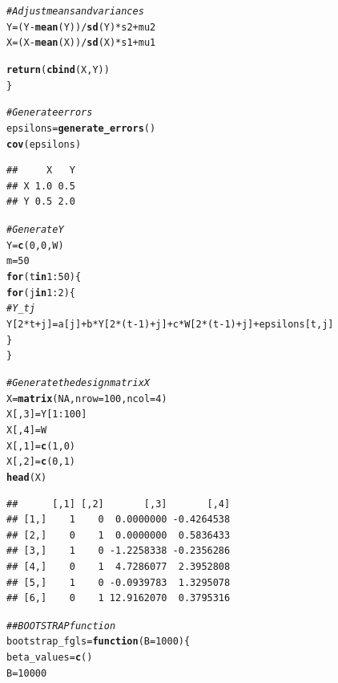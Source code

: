 \documentclass[11pt]{article}\usepackage[]{graphicx}\usepackage[]{color}
\makeatletter
\newcommand{\hlnum}[1]{\textcolor[rgb]{0.686,0.059,0.569}{#1}}%
\newcommand{\hlcom}[1]{\textcolor[rgb]{0.678,0.584,0.686}{\textit{#1}}}%
\newcommand{\hlopt}[1]{\textcolor[rgb]{0,0,0}{#1}}%
\newcommand{\hlstd}[1]{\textcolor[rgb]{0.345,0.345,0.345}{#1}}%
\newcommand{\hlkwa}[1]{\textcolor[rgb]{0.161,0.373,0.58}{\textbf{#1}}}%
\newcommand{\hlkwb}[1]{\textcolor[rgb]{0.69,0.353,0.396}{#1}}%
\newcommand{\hlkwc}[1]{\textcolor[rgb]{0.333,0.667,0.333}{#1}}%
\newcommand{\hlkwd}[1]{\textcolor[rgb]{0.737,0.353,0.396}{\textbf{#1}}}%
\newenvironment{kframe}{%
 \def\at@end@of@kframe{}%
 \ifinner\ifhmode%
  \def\at@end@of@kframe{\end{minipage}}%
  \begin{minipage}{\columnwidth}%
 \fi\fi%
 \def\FrameCommand##1{\hskip\@totalleftmargin \hskip-\fboxsep
 \colorbox{shadecolor}{##1}\hskip-\fboxsep
     \hskip-\linewidth \hskip-\@totalleftmargin \hskip\columnwidth}%
 \MakeFramed {\advance\hsize-\width
   \@totalleftmargin\z@ \linewidth\hsize
   \@setminipage}}%
 {\par\unskip\endMakeFramed%
 \at@end@of@kframe}
\newenvironment{knitrout}{}{} %
\makeatother
\begin{document}
\begin{knitrout}
\begin{kframe}
\begin{alltt}
  \hlcom{# Adjust means and variances}
  \hlstd{Y} \hlkwb{=} \hlstd{(Y}\hlopt{-}\hlkwd{mean}\hlstd{(Y))}\hlopt{/}\hlkwd{sd}\hlstd{(Y)}\hlopt{*}\hlstd{s2}\hlopt{+}\hlstd{mu2}
  \hlstd{X} \hlkwb{=} \hlstd{(X}\hlopt{-}\hlkwd{mean}\hlstd{(X))}\hlopt{/}\hlkwd{sd}\hlstd{(X)}\hlopt{*}\hlstd{s1}\hlopt{+}\hlstd{mu1}

  \hlkwd{return}\hlstd{(}\hlkwd{cbind}\hlstd{(X,Y))}
\hlstd{\}}

\hlcom{# Generate errors}
\hlstd{epsilons} \hlkwb{=} \hlkwd{generate_errors}\hlstd{()}
\hlkwd{cov}\hlstd{(epsilons)}
\end{alltt}
\begin{lstlisting}[basicstyle=\ttfamily,breaklines=true]
##     X   Y
## X 1.0 0.5
## Y 0.5 2.0
\end{lstlisting}
\begin{alltt}
\hlcom{# Generate Y}
\hlstd{Y} \hlkwb{=} \hlkwd{c}\hlstd{(}\hlnum{0}\hlstd{,}\hlnum{0}\hlstd{,W)}
\hlstd{m} \hlkwb{=} \hlnum{50}
\hlkwa{for} \hlstd{(t} \hlkwa{in} \hlnum{1}\hlopt{:}\hlnum{50}\hlstd{) \{}
  \hlkwa{for} \hlstd{(j} \hlkwa{in} \hlnum{1}\hlopt{:}\hlnum{2}\hlstd{)\{}
    \hlcom{# Y_tj}
    \hlstd{Y[}\hlnum{2}\hlopt{*}\hlstd{t}\hlopt{+}\hlstd{j]} \hlkwb{=} \hlstd{a[j]} \hlopt{+} \hlstd{b}\hlopt{*}\hlstd{Y[}\hlnum{2}\hlopt{*}\hlstd{(t}\hlopt{-}\hlnum{1}\hlstd{)}\hlopt{+}\hlstd{j]} \hlopt{+} \hlstd{c}\hlopt{*}\hlstd{W[}\hlnum{2}\hlopt{*}\hlstd{(t}\hlopt{-}\hlnum{1}\hlstd{)}\hlopt{+}\hlstd{j]} \hlopt{+} \hlstd{epsilons[t,j]}
  \hlstd{\}}
\hlstd{\}}

\hlcom{# Generate the design matrix X}
\hlstd{X} \hlkwb{=} \hlkwd{matrix}\hlstd{(}\hlnum{NA}\hlstd{,}\hlkwc{nrow} \hlstd{=} \hlnum{100}\hlstd{,} \hlkwc{ncol}\hlstd{=}\hlnum{4}\hlstd{)}
\hlstd{X[,}\hlnum{3}\hlstd{]} \hlkwb{=} \hlstd{Y[}\hlnum{1}\hlopt{:}\hlnum{100}\hlstd{]}
\hlstd{X[,}\hlnum{4}\hlstd{]} \hlkwb{=} \hlstd{W}
\hlstd{X[,}\hlnum{1}\hlstd{]} \hlkwb{=} \hlkwd{c}\hlstd{(}\hlnum{1}\hlstd{,}\hlnum{0}\hlstd{)}
\hlstd{X[,}\hlnum{2}\hlstd{]} \hlkwb{=} \hlkwd{c}\hlstd{(}\hlnum{0}\hlstd{,}\hlnum{1}\hlstd{)}
\hlkwd{head}\hlstd{(X)}
\end{alltt}
\begin{lstlisting}[basicstyle=\ttfamily,breaklines=true]
##      [,1] [,2]       [,3]       [,4]
## [1,]    1    0  0.0000000 -0.4264538
## [2,]    0    1  0.0000000  0.5836433
## [3,]    1    0 -1.2258338 -0.2356286
## [4,]    0    1  4.7286077  2.3952808
## [5,]    1    0 -0.0939783  1.3295078
## [6,]    0    1 12.9162070  0.3795316
\end{lstlisting}
\begin{alltt}
\hlcom{## BOOTSTRAP function}
\hlstd{bootstrap_fgls} \hlkwb{=} \hlkwa{function}\hlstd{(}\hlkwc{B} \hlstd{=} \hlnum{1000}\hlstd{)\{}
  \hlstd{beta_values} \hlkwb{=} \hlkwd{c}\hlstd{()}
  \hlstd{B} \hlkwb{=} \hlnum{10000}


\end{alltt}
\end{kframe}
\end{knitrout}
\end{document}
